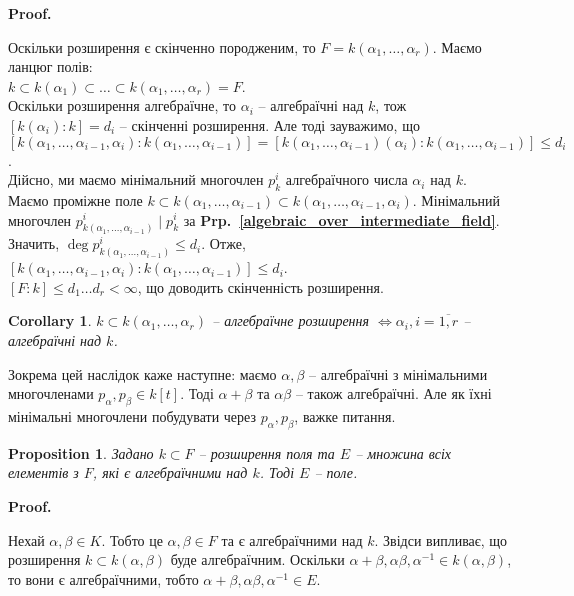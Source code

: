 \documentclass[a4paper, 10pt]{article}
\makeatletter
\theoremstyle{theoremdd}
\theoremstyle{theoremdd}
\theoremstyle{theoremdd}
\theoremstyle{theoremdd}
\theoremstyle{theoremdd}
\theoremstyle{theoremdd}
\theoremstyle{theoremdd}
\theoremstyle{theoremdd}
\theoremstyle{theoremdd}
\newtheorem{proposition}[theorem]{Proposition}
\theoremstyle{theoremdd}
\theoremstyle{theoremdd}
\theoremstyle{theoremdd}
\theoremstyle{theoremdd}
\theoremstyle{theoremdd}
\newtheorem{corollary}[theorem]{Corollary}
\theoremstyle{theoremdd}
\renewenvironment{proof}[1][Proof.\\]{\par
\pushQED{\hfill \qed}%
\normalfont \topsep6\p@\@plus6\p@\relax
\trivlist
\item\relax
{\bfseries
#1\@addpunct{.}}\hspace\labelsep\ignorespaces
}{%
\popQED\endtrivlist\@endpefalse
}
\newcommand\prpref[1]{\textbf{Prp.~\ref{#1}}}
\makeatother
\begin{document}
\begin{proof}
Оскільки розширення є скінченно породженим, то $F = k(\alpha_1,\dots,\alpha_r)$. Маємо ланцюг полів: \\
$k \subset k(\alpha_1) \subset \dots \subset k(\alpha_1,\dots,\alpha_r) = F$.\\
Оскільки розширення алгебраїчне, то $\alpha_i$ -- алгебраїчні над $k$, тож $[k(\alpha_i):k] = d_i$ -- скінченні розширення. Але тоді зауважимо, що \\ $[k(\alpha_1,\dots,\alpha_{i-1},\alpha_i) : k(\alpha_1,\dots,\alpha_{i-1})] = [k(\alpha_1,\dots,\alpha_{i-1})(\alpha_i) : k(\alpha_1,\dots,\alpha_{i-1})] \leq d_i$.\\
Дійсно, ми маємо мінімальний многочлен $p^i_k$ алгебраїчного числа $\alpha_i$ над $k$. Маємо проміжне поле $k \subset k(\alpha_1,\dots,\alpha_{i-1}) \subset k(\alpha_1,\dots,\alpha_{i-1},\alpha_i)$. Мінімальний многочлен $p^i_{k(\alpha_1,\dots,\alpha_{i-1})} \mid p^i_{k}$ за \prpref{algebraic_over_intermediate_field}. Значить, $\deg p^i_{k(\alpha_1,\dots,\alpha_{i-1})} \leq d_i$. Отже, $[k(\alpha_1,\dots,\alpha_{i-1},\alpha_i) : k(\alpha_1,\dots,\alpha_{i-1})] \leq d_i$.\\
$[F:k] \leq d_1 \dots d_r < \infty$, що доводить скінченність розширення.
\end{proof}

\begin{corollary}
$k \subset k(\alpha_1,\dots,\alpha_r)$ -- алгебраїчне розширення $\iff \alpha_i , i =\overline{1,r}$ -- алгебраїчні над $k$.
\end{corollary}

Зокрема цей наслідок каже наступне: маємо $\alpha, \beta$ -- алгебраїчні з мінімальними многочленами $p_\alpha, p_\beta \in k[t]$. Тоді $\alpha+\beta$ та $\alpha \beta$ -- також алгебраїчні. Але як їхні мінімальні многочлени побудувати через $p_\alpha, p_\beta$, важке питання.

\begin{proposition}
Задано $k \subset F$ -- розширення поля та $E$ -- множина всіх елементів з $F$, які є алгебраїчними над $k$. Тоді $E$ -- поле.
\end{proposition}

\begin{proof}
Нехай $\alpha,\beta \in K$. Тобто це $\alpha,\beta \in F$ та є алгебраїчними над $k$. Звідси випливає, що розширення $k \subset k(\alpha,\beta)$ буде алгебраїчним. Оскільки $\alpha+\beta, \alpha \beta, \alpha^{-1} \in k(\alpha,\beta)$, то вони є алгебраїчними, тобто $\alpha+\beta, \alpha \beta, \alpha^{-1} \in E$.
\end{proof}
\end{document}
